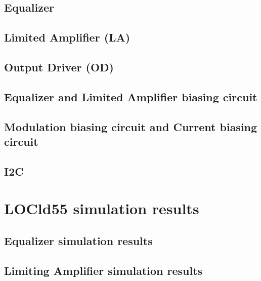 \documentclass[11pt,a4paper]{article}
\begin{document}
\begin{spacing}{1.25}
\subsection{Equalizer}

\subsection{Limited Amplifier (LA)}

\subsection{Output Driver (OD)}

\subsection{Equalizer and Limited Amplifier biasing circuit}

\subsection{Modulation biasing circuit and Current biasing circuit}

\subsection{I2C}

\section{LOCld55 simulation results}        %

\subsection{Equalizer simulation results}

\subsection{Limiting Amplifier simulation results}


\end{spacing}



\end{document}
